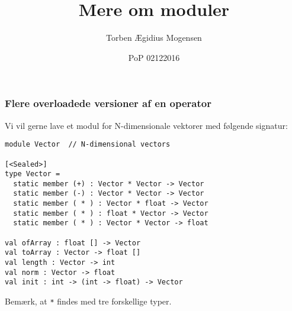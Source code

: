 \documentclass{beamer}
\title{Mere om moduler}
\date[2016]{PoP 02122016}
\author{Torben Ægidius Mogensen}
\begin{document}
\begin{frame}
\titlepage
\end{frame}






\begin{frame}[fragile=singleslide]
\frametitle{Flere overloadede versioner af en operator}

Vi vil gerne lave et modul for N-dimensionale vektorer med følgende signatur:

\renewcommand{\baselinestretch}{0.82}
{\small
\begin{verbatim}
module Vector  // N-dimensional vectors

[<Sealed>]
type Vector =
  static member (+) : Vector * Vector -> Vector
  static member (-) : Vector * Vector -> Vector
  static member ( * ) : Vector * float -> Vector
  static member ( * ) : float * Vector -> Vector
  static member ( * ) : Vector * Vector -> float

val ofArray : float [] -> Vector
val toArray : Vector -> float []
val length : Vector -> int
val norm : Vector -> float
val init : int -> (int -> float) -> Vector
\end{verbatim}
}
\renewcommand{\baselinestretch}{1.0}

Bemærk, at \texttt{*} findes med tre forskellige typer.
\end{frame}
\end{document}
